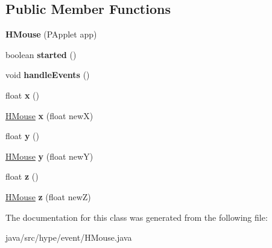 \subsection*{Public Member Functions}
\begin{DoxyCompactItemize}
\item 
\hypertarget{classhype_1_1event_1_1_h_mouse_a0ac8e5d2ccc6c12a7b1e05a6c42d94d1}{{\bfseries H\-Mouse} (P\-Applet app)}\label{classhype_1_1event_1_1_h_mouse_a0ac8e5d2ccc6c12a7b1e05a6c42d94d1}

\item 
\hypertarget{classhype_1_1event_1_1_h_mouse_ac573179fd6a317b9655c5c85f35ad682}{boolean {\bfseries started} ()}\label{classhype_1_1event_1_1_h_mouse_ac573179fd6a317b9655c5c85f35ad682}

\item 
\hypertarget{classhype_1_1event_1_1_h_mouse_abb6b90eddc9ed4c5c572f06cb47cf02d}{void {\bfseries handle\-Events} ()}\label{classhype_1_1event_1_1_h_mouse_abb6b90eddc9ed4c5c572f06cb47cf02d}

\item 
\hypertarget{classhype_1_1event_1_1_h_mouse_a46e064610253ef6c3af70c75617768ed}{float {\bfseries x} ()}\label{classhype_1_1event_1_1_h_mouse_a46e064610253ef6c3af70c75617768ed}

\item 
\hypertarget{classhype_1_1event_1_1_h_mouse_a03b9ab054a4717ce62a88c0f9825b7f3}{\hyperlink{classhype_1_1event_1_1_h_mouse}{H\-Mouse} {\bfseries x} (float new\-X)}\label{classhype_1_1event_1_1_h_mouse_a03b9ab054a4717ce62a88c0f9825b7f3}

\item 
\hypertarget{classhype_1_1event_1_1_h_mouse_ad3d1e1b83ef8b95ae21b6809f0b3c747}{float {\bfseries y} ()}\label{classhype_1_1event_1_1_h_mouse_ad3d1e1b83ef8b95ae21b6809f0b3c747}

\item 
\hypertarget{classhype_1_1event_1_1_h_mouse_a68db2a9622f518baa89ec44341532014}{\hyperlink{classhype_1_1event_1_1_h_mouse}{H\-Mouse} {\bfseries y} (float new\-Y)}\label{classhype_1_1event_1_1_h_mouse_a68db2a9622f518baa89ec44341532014}

\item 
\hypertarget{classhype_1_1event_1_1_h_mouse_a169daaced368f192805d39527c457685}{float {\bfseries z} ()}\label{classhype_1_1event_1_1_h_mouse_a169daaced368f192805d39527c457685}

\item 
\hypertarget{classhype_1_1event_1_1_h_mouse_af9d6afdcbccdf0fcb958b02950acc37c}{\hyperlink{classhype_1_1event_1_1_h_mouse}{H\-Mouse} {\bfseries z} (float new\-Z)}\label{classhype_1_1event_1_1_h_mouse_af9d6afdcbccdf0fcb958b02950acc37c}

\end{DoxyCompactItemize}


The documentation for this class was generated from the following file\-:\begin{DoxyCompactItemize}
\item 
java/src/hype/event/H\-Mouse.\-java\end{DoxyCompactItemize}
